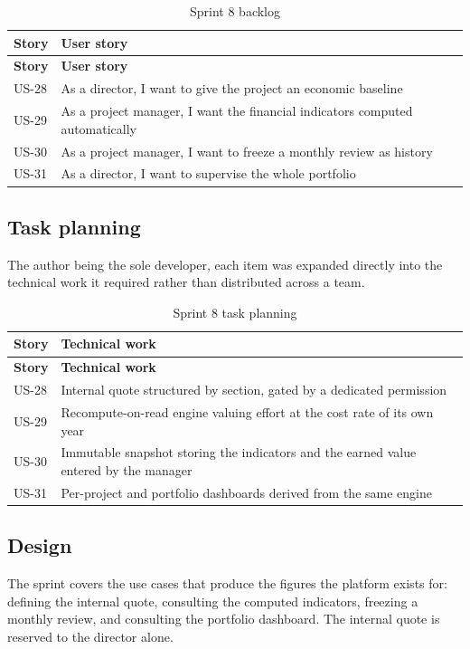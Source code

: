 \begin{longtable}{|m{1.6cm}|m{12.4cm}|}
\caption{Sprint 8 backlog}\label{tab:sb8}\\
\hline
\textbf{Story} & \textbf{User story} \\
\hline
\endfirsthead
\hline
\textbf{Story} & \textbf{User story} \\
\hline
\endhead
\endfoot
\endlastfoot
\hline
US-28 & As a director, I want to give the project an economic baseline \\
\hline
US-29 & As a project manager, I want the financial indicators computed automatically \\
\hline
US-30 & As a project manager, I want to freeze a monthly review as history \\
\hline
US-31 & As a director, I want to supervise the whole portfolio \\
\hline
\end{longtable}

\subsection{Task planning}
The author being the sole developer, each item was expanded directly into the technical work it
required rather than distributed across a team.

\begin{longtable}{|m{1.6cm}|m{12.4cm}|}
\caption{Sprint 8 task planning}\label{tab:tp8}\\
\hline
\textbf{Story} & \textbf{Technical work} \\
\hline
\endfirsthead
\hline
\textbf{Story} & \textbf{Technical work} \\
\hline
\endhead
\endfoot
\endlastfoot
\hline
US-28 & Internal quote structured by section, gated by a dedicated permission \\
\hline
US-29 & Recompute-on-read engine valuing effort at the cost rate of its own year \\
\hline
US-30 & Immutable snapshot storing the indicators and the earned value entered by the manager \\
\hline
US-31 & Per-project and portfolio dashboards derived from the same engine \\
\hline
\end{longtable}

\subsection{Design}
The sprint covers the use cases that produce the figures the platform exists for: defining the
internal quote, consulting the computed indicators, freezing a monthly review, and consulting the
portfolio dashboard. The internal quote is reserved to the director alone.

